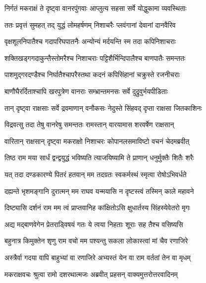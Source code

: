 
\twolineshloka
{निर्गतं मकराक्षं ते दृष्ट्वा वानरपुंगवाः}
{आप्लुत्य सहसा सर्वे योद्धुकामा व्यवस्थिताः} %

\twolineshloka
{ततः प्रवृत्तं सुमहत् तद् युद्धं लोमहर्षणम्}
{निशाचरैः प्लवंगानां देवानां दानवैरिव} %

\twolineshloka
{वृक्षशूलनिपातैश्च गदापरिघपातनैः}
{अन्योन्यं मर्दयन्ति स्म तदा कपिनिशाचराः} %

\twolineshloka
{शक्तिखड्गगदाकुन्तैस्तोमरैश्च निशाचराः}
{पट्टिशैर्भिन्दिपालैश्च बाणपातैः समन्ततः} %

\twolineshloka
{पाशमुद्गरदण्डैश्च निर्घातैश्चापरैस्तथा}
{कदनं कपिसिंहानां चक्रुस्ते रजनीचराः} %

\twolineshloka
{बाणौघैरर्दिताश्चापि खरपुत्रेण वानराः}
{सम्भ्रान्तमनसः सर्वे दुद्रुवुर्भयपीडिताः} %

\twolineshloka
{तान् दृष्ट्वा राक्षसाः सर्वे द्रवमाणान् वनौकसः}
{नेदुस्ते सिंहवद् दृप्ता राक्षसा जितकाशिनः} %

\twolineshloka
{विद्रवत्सु तदा तेषु वानरेषु समन्ततः}
{रामस्तान् वारयामास शरवर्षेण राक्षसान्} %

\twolineshloka
{वारितान् राक्षसान् दृष्ट्वा मकराक्षो निशाचरः}
{कोपानलसमाविष्टो वचनं चेदमब्रवीत्} %

\twolineshloka
{तिष्ठ राम मया सार्धं द्वन्द्वयुद्धं भविष्यति}
{त्याजयिष्यामि ते प्राणान् धनुर्मुक्तैः शितैः शरैः} %

\twolineshloka
{यत् तदा दण्डकारण्ये पितरं हतवान् मम}
{तदग्रतः स्वकर्मस्थं स्मृत्वा रोषोऽभिवर्धते} %

\twolineshloka
{दह्यन्ते भृशमङ्गानि दुरात्मन् मम राघव}
{यन्मयासि न दृष्टस्त्वं तस्मिन् काले महावने} %

\twolineshloka
{दिष्ट्यासि दर्शनं राम मम त्वं प्राप्तवानिह}
{कांक्षितोऽसि क्षुधार्तस्य सिंहस्येवेतरो मृगः} %

\twolineshloka
{अद्य मद्बाणवेगेन प्रेतराड्विषयं गतः}
{ये त्वया निहताः शूराः सह तैश्च वसिष्यसि} %

\twolineshloka
{बहुनात्र किमुक्तेन शृणु राम वचो मम}
{पश्यन्तु सकला लोकास्त्वां मां चैव रणाजिरे} %

\twolineshloka
{अस्त्रैर्वा गदया वापि बाहुभ्यां वा रणाजिरे}
{अभ्यस्तं येन वा राम वर्ततां तेन वा मृधम्} %

\twolineshloka
{मकराक्षवचः श्रुत्वा रामो दशरथात्मजः}
{अब्रवीत् प्रहसन् वाक्यमुत्तरोत्तरवादिनम्} %

